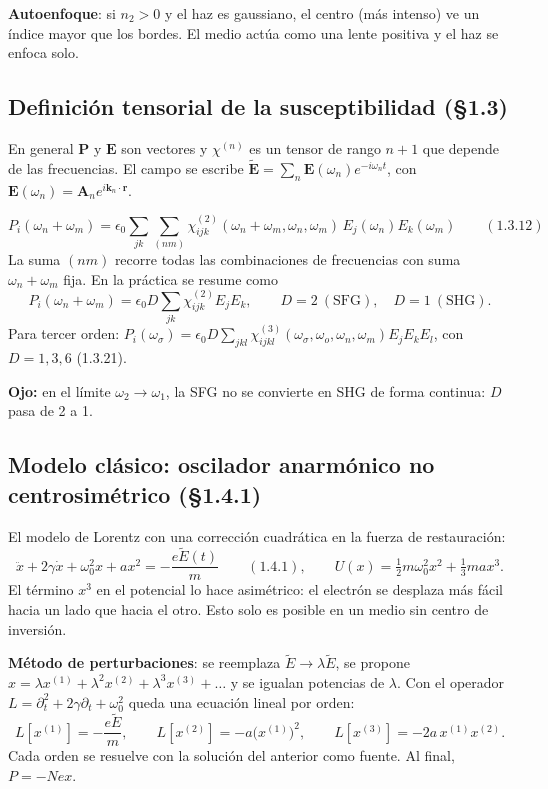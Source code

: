 \documentclass[10pt]{article}
\newcommand{\ojo}[1]{{\color{alerta}\textbf{Ojo:} #1}}
\begin{document}
\textbf{Autoenfoque}: si $n_2>0$ y el haz es gaussiano, el centro (más intenso) ve un índice mayor que los bordes. El medio actúa como una lente positiva y el haz se enfoca solo.

\subsection{Definición tensorial de la susceptibilidad (§1.3)}
En general $\mathbf P$ y $\mathbf E$ son vectores y $\chi^{(n)}$ es un tensor de rango $n+1$ que depende de las frecuencias. El campo se escribe $\tilde{\mathbf E}=\sum_n\mathbf E(\omega_n)e^{-i\omega_nt}$, con $\mathbf E(\omega_n)=\mathbf A_ne^{i\mathbf k_n\cdot\mathbf r}$.

\begin{clave}[title={Definición de $\chi^{(2)}_{ijk}$ y $\chi^{(3)}_{ijkl}$}]
\[
P_i(\omega_n+\omega_m)=\epsilon_0\sum_{jk}\sum_{(nm)}\chi^{(2)}_{ijk}(\omega_n+\omega_m,\omega_n,\omega_m)\,E_j(\omega_n)E_k(\omega_m)\qquad(1.3.12)
\]
La suma $(nm)$ recorre todas las combinaciones de frecuencias con suma $\omega_n+\omega_m$ fija. En la práctica se resume como
\[
P_i(\omega_n+\omega_m)=\epsilon_0D\sum_{jk}\chi^{(2)}_{ijk}E_jE_k,\qquad D=2\ (\text{SFG}),\quad D=1\ (\text{SHG}).
\]
Para tercer orden: $P_i(\omega_\sigma)=\epsilon_0D\sum_{jkl}\chi^{(3)}_{ijkl}(\omega_\sigma,\omega_o,\omega_n,\omega_m)E_jE_kE_l$, con $D=1,3,6$ (1.3.21).
\end{clave}
\ojo{en el límite $\omega_2\to\omega_1$, la SFG no se convierte en SHG de forma continua: $D$ pasa de 2 a 1.}

\subsection{Modelo clásico: oscilador anarmónico no centrosimétrico (§1.4.1)}
El modelo de Lorentz con una corrección cuadrática en la fuerza de restauración:
\[
\ddot x+2\gamma\dot x+\omega_0^2x+ax^2=-\frac{e\tilde E(t)}{m}\qquad(1.4.1),\qquad U(x)=\tfrac12m\omega_0^2x^2+\tfrac13max^3 .
\]
El término $x^3$ en el potencial lo hace asimétrico: el electrón se desplaza más fácil hacia un lado que hacia el otro. Esto solo es posible en un medio sin centro de inversión.

\textbf{Método de perturbaciones}: se reemplaza $\tilde E\to\lambda\tilde E$, se propone $x=\lambda x^{(1)}+\lambda^2x^{(2)}+\lambda^3x^{(3)}+\dots$ y se igualan potencias de $\lambda$. Con el operador $L=\partial_t^2+2\gamma\partial_t+\omega_0^2$ queda una ecuación lineal por orden:
\[
L[x^{(1)}]=-\frac{e\tilde E}{m},\qquad L[x^{(2)}]=-a\big(x^{(1)}\big)^2,\qquad L[x^{(3)}]=-2a\,x^{(1)}x^{(2)} .
\]
Cada orden se resuelve con la solución del anterior como fuente. Al final, $P=-Nex$.
\end{document}
